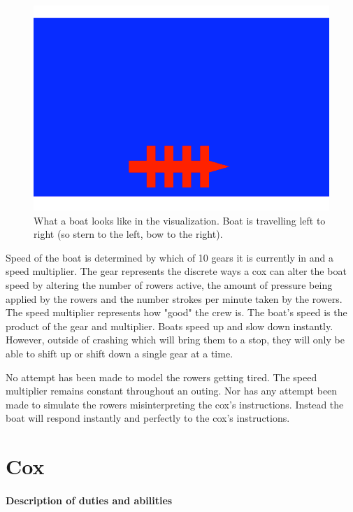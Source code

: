       \begin{figure}[h]
      \begin{center}
      	\includegraphics[scale=0.3]{images/boat.png}
      	\caption{What a boat looks like in the visualization. Boat is travelling left to right (so stern to the left, bow to the right).}
      	\label{fig:model:boat}
      \end{center}
      \end{figure}
      
      Speed of the boat is determined by which of 10 gears it is currently in and a speed multiplier. The gear represents the discrete ways a cox can alter the boat speed by altering the number of rowers active, the amount of pressure being applied by the rowers and the number strokes per minute taken by the rowers. The speed multiplier represents how "good" the crew is. The boat's speed is the product of the gear and multiplier. Boats speed up and slow down instantly. However, outside of crashing which will bring them to a stop, they will only be able to shift up or shift down a single gear at a time.
      
      No attempt has been made to model the rowers getting tired. The speed multiplier remains constant throughout an outing. Nor has any attempt been made to simulate the rowers misinterpreting the cox's instructions. Instead the boat will respond instantly and perfectly to the cox's instructions.
      
    \section{Cox}
      \paragraph{Description of duties and abilities}
